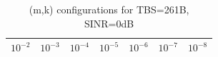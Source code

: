 \begin{table}[ht]
\centering
\caption{(m,k) configurations for TBS=261B, SINR=0dB}
\label{tab:conf_{261B_0dB}}
\begin{tabular}{ccccccc}
\hline
$10^{-2}$ & $10^{-3}$ & $10^{-4}$ & $10^{-5}$ & $10^{-6}$ & $10^{-7}$ & $10^{-8}$ \\ \hline
\hline
\end{tabular}
\end{table}